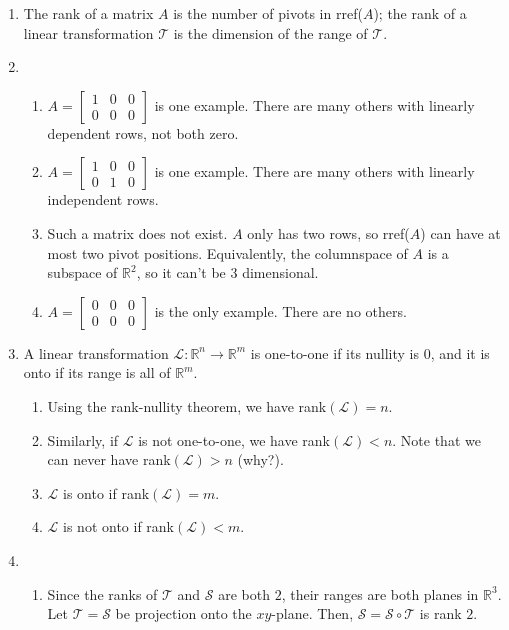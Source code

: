\documentclass[red]{tutorial}
\newcommand{\R}{\mathbb{R}}
\theoremstyle{definition}
\theoremstyle{theorem}
\begin{document}
	\begin{solutions}
		\begin{enumerate}
			\item
					The rank of a matrix $A$ is the number of pivots in rref($A$);
					the rank of a linear transformation $\mathcal T$ is the dimension of the range of $\mathcal T$.
			\item
			\begin{enumerate}
				\item $A=\begin{bmatrix}
					1 & 0 & 0 \\
					0 & 0 & 0
					\end{bmatrix}$ is one example. There are many others with linearly dependent rows, not both zero.
				\item $A=\begin{bmatrix}
					1 & 0 & 0 \\
					0 & 1 & 0
					\end{bmatrix}$ is one example. There are many others with linearly independent rows.
				\item Such a matrix does not exist. $A$ only has two rows, so rref($A$) can have at most two pivot positions. Equivalently, the columnspace of $A$ is a subspace of $\R^2$, so it can't be $3$ dimensional.
				\item $A=\begin{bmatrix}
					0 & 0 & 0 \\
					0 & 0 & 0
					\end{bmatrix}$ is the only example. There are no others.
			\end{enumerate}
			\item A linear transformation $\mathcal L:\R^n\to\R^m$
				is one-to-one if its nullity is $0$, and it is onto if its range is
				all of $\R^m$.
			\begin{enumerate}
				\item Using the rank-nullity theorem, we have rank$(\mathcal L) = n$.
				\item Similarly, if $\mathcal L$ is not one-to-one, we have rank$(\mathcal L) < n$. Note that we can never have rank$(\mathcal L)>n$ (why?).
				\item $\mathcal L$ is onto if rank$(\mathcal L)=m$.
				\item $\mathcal L$ is not onto if rank$(\mathcal L)<m$.
			\end{enumerate}
			\item
			\begin{enumerate}
				\item Since the ranks of $\mathcal T$ and $\mathcal S$ are both $2$,
					their ranges are both planes in $\R^{3}$. Let $\mathcal T=\mathcal
					S$ be projection onto the $xy$-plane. Then,
					$\mathcal S=\mathcal S\circ \mathcal T$ is rank $2$.


\end{enumerate}
\end{enumerate}
\end{solutions}
\end{document}
